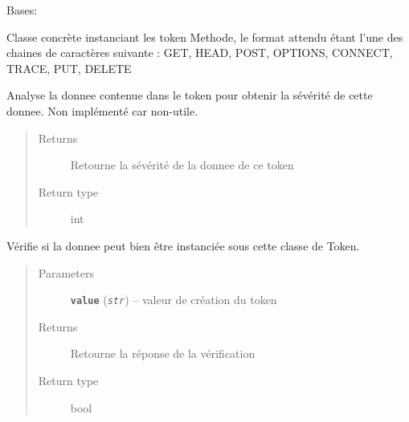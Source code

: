 \documentclass[letterpaper,10pt,english]{sphinxmanual}
\begin{document}

\begin{fulllineitems}
\label{loganalyser:loganalyser.token.Method}
Bases: {\hyperref[loganalyser:loganalyser.token.Token]{\emph{}}}

Classe concrète instanciant les token Methode, le format attendu étant l'une des chaines de caractères suivante : GET, HEAD, POST, OPTIONS, CONNECT, TRACE, PUT, DELETE

\begin{fulllineitems}
\label{loganalyser:loganalyser.token.Method._Token__analyse}
Analyse la donnee contenue dans le token pour obtenir la sévérité de cette donnee. Non implémenté car non-utile.
\begin{quote}\begin{description}
\item[{Returns}] \leavevmode
Retourne la sévérité de la donnee de ce token

\item[{Return type}] \leavevmode
int

\end{description}\end{quote}

\end{fulllineitems}


\begin{fulllineitems}
\label{loganalyser:loganalyser.token.Method._Token__verifier_type}
Vérifie si la donnee peut bien être instanciée sous cette classe de Token.
\begin{quote}\begin{description}
\item[{Parameters}] \leavevmode
\textbf{\texttt{value}} (\emph{\texttt{str}}) -- valeur de création du token

\item[{Returns}] \leavevmode
Retourne la réponse de la vérification

\item[{Return type}] \leavevmode
bool

\end{description}\end{quote}

\end{fulllineitems}


\end{fulllineitems}
\end{document}
